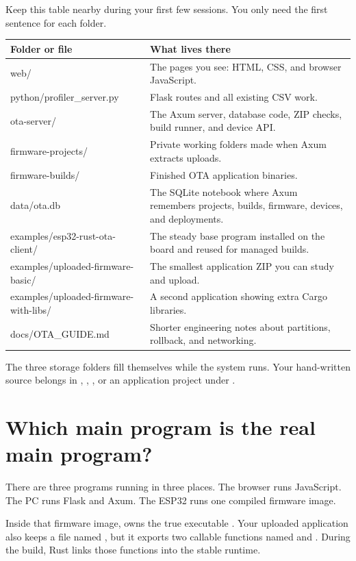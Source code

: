Keep this table nearby during your first few sessions. You only need the first sentence for each folder.

\begin{longtable}{>{\ttfamily\footnotesize\raggedright\arraybackslash}p{}p{}}
\toprule
Folder or file & What lives there\\
\midrule
\endhead
web/ & The pages you see: HTML, CSS, and browser JavaScript.\\
python/profiler\_server.py & Flask routes and all existing CSV work.\\
ota-server/ & The Axum server, database code, ZIP checks, build runner, and device API.\\
firmware-projects/ & Private working folders made when Axum extracts uploads.\\
firmware-builds/ & Finished OTA application binaries.\\
data/ota.db & The SQLite notebook where Axum remembers projects, builds, firmware, devices, and deployments.\\
examples/esp32-rust-ota-client/ & The steady base program installed on the board and reused for managed builds.\\
examples/uploaded-firmware-basic/ & The smallest application ZIP you can study and upload.\\
examples/uploaded-firmware-with-libs/ & A second application showing extra Cargo libraries.\\
docs/OTA\_GUIDE.md & Shorter engineering notes about partitions, rollback, and networking.\\
\bottomrule
\end{longtable}

The three storage folders fill themselves while the system runs. Your hand-written source belongs in , , , or an application project under .

\section{Which main program is the real main program?}

There are three programs running in three places. The browser runs JavaScript. The PC runs Flask and Axum. The ESP32 runs one compiled firmware image.

Inside that firmware image,  owns the true executable . Your uploaded application also keeps a file named , but it exports two callable functions named  and . During the build, Rust links those functions into the stable runtime.

